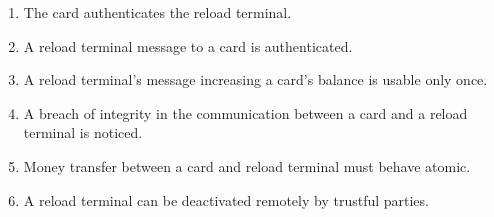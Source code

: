 \begin{enumerate}[label={SR\arabic*:}, leftmargin=3\parindent]

    \item \label{sr:cardAuthReload}
    The card authenticates the reload terminal.
    \item \label{sr:reloadCardMessageAuth}
    A reload terminal message to a card is authenticated.
    \item \label{sr:noReplayLoadingCard}
    A reload terminal's message increasing a card's balance is usable only once.
    \item \label{sr:cardReloadMessageIntegrity}
    A breach of integrity in the communication between a card and a reload terminal is noticed.
    \item \label{sr:cardReloadtransterAtomic}
    Money transfer between a card and reload terminal must behave atomic.
    \item \label{sr:disableReload}
    A reload terminal can be deactivated remotely by trustful parties.


\end{enumerate}
